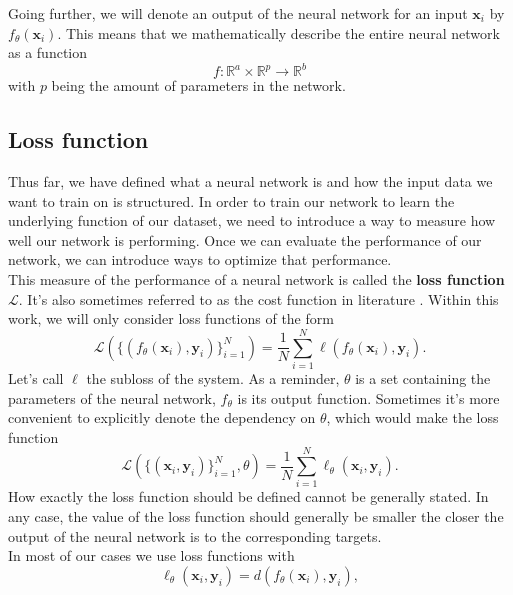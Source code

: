 Going further, we will denote an output of the neural network for an input $\mathbf{x}_i$ by $f_\theta(\mathbf{x}_i)$. This means that we mathematically describe the entire neural network as a function
\begin{equation}
	f: \mathbb{R}^a \times \mathbb{R}^p \rightarrow \mathbb{R}^b
\end{equation}
with $p$ being the amount of parameters in the network.
\subsection{Loss function}
Thus far, we have defined what a neural network is and how the input data we want to train on is structured. In order to train our network to learn the underlying function of our dataset, we need to introduce a way to measure how well our network is performing. Once we can evaluate the performance of our network, we can introduce ways to optimize that performance.\\
This measure of the performance of a neural network is called the \textbf{loss function} $\mathscr{L}$. It's also sometimes referred to as the cost function in literature \cite{NGD}. Within this work, we will only consider loss functions of the form 
\begin{equation}
	\mathscr{L}\left( \{(f_\theta(\mathbf{x}_i), \mathbf{y}_i)\}_{i=1}^{N} \right) = \frac{1}{N} \sum_{i=1}^{N} \ell\left(f_\theta(\mathbf{x}_i),\mathbf{y}_i\right).
	\label{eq:Loss_longform_withFunctiondependency}
\end{equation}
Let's call $\ell$ the subloss of the system. As a reminder, $\theta$ is a set containing the parameters of the neural network, $f_\theta$ is its output function. Sometimes it's more convenient to explicitly denote the dependency on $\theta$, which would make the loss function
\begin{equation}\label{eq:Loss_longform}
	\mathscr{L}\left( \{(\mathbf{x}_i, \mathbf{y}_i)\}_{i=1}^{N}, \theta \right) = \frac{1}{N} \sum_{i=1}^{N} \ell_\theta\left(\mathbf{x}_i,\mathbf{y}_i\right).
\end{equation}
How exactly the loss function should be defined cannot be generally stated. In any case, the value of the loss function should generally be smaller the closer the output of the neural network is to the corresponding targets.\\
In most of our cases we use loss functions with 
\begin{equation}\label{eq:DistanceLoss}
	\ell_\theta \left( \mathbf{x}_i,\mathbf{y}_i\right) = 
	d\left(f_\theta(\mathbf{x}_i), \mathbf{y}_i\right),
\end{equation}
